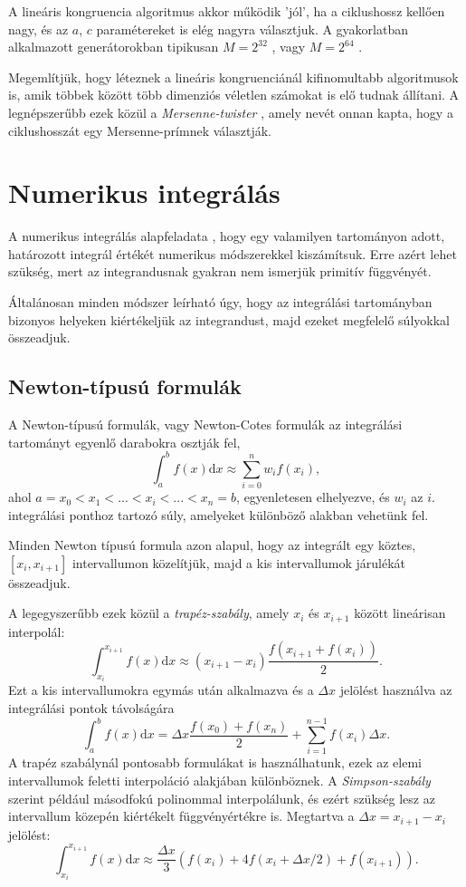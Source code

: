 \documentclass[12pt]{article}
\theoremstyle{plain}
\begin{document}
A lineáris kongruencia algoritmus akkor működik 'jól', ha a ciklushossz kellően nagy, és az $a$, $c$ paramétereket is elég nagyra választjuk. A gyakorlatban alkalmazott generátorokban tipikusan $M=2^{32}$ \cite{numrecipes}, vagy $M=2^{64}$ \cite{knuth}. 

Megemlítjük, hogy léteznek a lineáris kongruenciánál kifinomultabb algoritmusok is, amik többek között több dimenziós véletlen számokat is elő tudnak állítani. A legnépszerűbb ezek közül a {\em Mersenne-twister} \cite{random}, amely nevét onnan kapta, hogy a ciklushosszát egy Mersenne-prímnek választják.  
\section{Numerikus integrálás}
A numerikus integrálás alapfeladata \cite{landa}, hogy egy valamilyen tartományon adott, határozott integrál értékét numerikus módszerekkel kiszámítsuk. Erre azért lehet szükség, mert az integrandusnak gyakran nem ismerjük primitív függvényét. 

Általánosan minden módszer leírható úgy, hogy az integrálási tartományban bizonyos helyeken kiértékeljük az integrandust, majd ezeket megfelelő súlyokkal összeadjuk. 
\subsection{Newton-típusú formulák}
A Newton-típusú formulák, vagy Newton-Cotes formulák az integrálási tartományt egyenlő darabokra osztják fel,
\begin{equation}
    \label{nc}
    \int_a^b f(x) \text{d}x  \approx \sum_{i=0}^n w_i f(x_i),
\end{equation}
ahol $a = x_0 < x_1 < ... < x_i < ... < x_n=b$, egyenletesen elhelyezve, és $w_i$ az $i$. integrálási ponthoz tartozó súly, amelyeket különböző alakban vehetünk fel. 

Minden Newton típusú formula azon alapul, hogy az integrált egy köztes, $[x_i, x_{i+1}]$ intervallumon közelítjük, majd a kis intervallumok járulékát összeadjuk. 

A legegyszerűbb ezek közül a {\em trapéz-szabály}, amely $x_i$ és $x_{i+1}$ között lineárisan interpolál:
\begin{equation}
    \label{trap}
    \int_{x_{i}}^{x_{i+1}} f(x) \text{d}x \approx (x_{i+1} - x_i) \frac{f(x_{i+1} + f(x_i))}{2}.
\end{equation}
Ezt a kis intervallumokra egymás után alkalmazva és a $\Delta x$ jelölést használva az integrálási pontok távolságára
\begin{equation}
    \int_a^b f(x) \text{d}x  = \Delta x  \frac{f(x_0) + f(x_n)}{2} + \sum_{i = 1} ^{n-1}f(x_i)\Delta x.
\end{equation}
A trapéz szabálynál pontosabb formulákat is használhatunk, ezek az elemi intervallumok feletti interpoláció alakjában különböznek. 
A {\em Simpson-szabály} szerint például másodfokú polinommal interpolálunk, és ezért szükség lesz az intervallum közepén kiértékelt függvényértékre is. Megtartva a $\Delta x = x_{i+1} - x_i$ jelölést:
\begin{equation}
    \int_{x_{i}}^{x_{i+1}} f(x) \text{d}x \approx \frac{\Delta x}{3}\left( f(x_i) + 4f(x_i+\Delta x/2) + f(x_{i+1})\right).
\end{equation}
\end{document}
